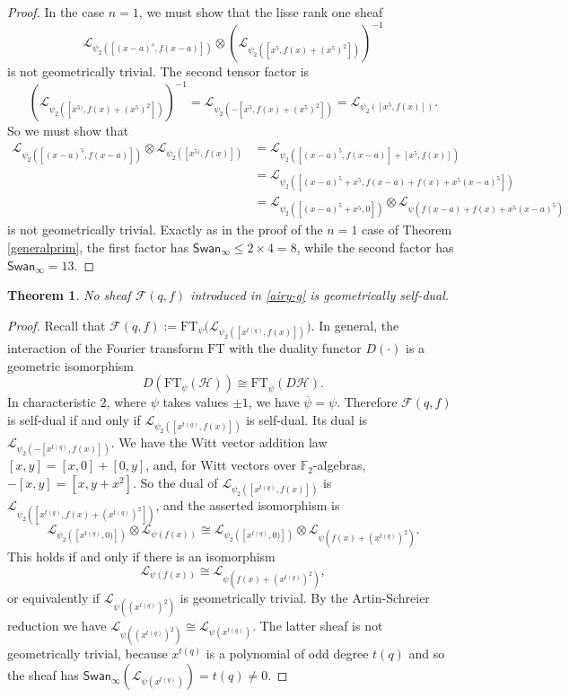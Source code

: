 \documentclass[11pt]{amsart}
\theoremstyle{plain}
\newtheorem{thm}{Theorem}
\theoremstyle{definition}
\numberwithin{thm}{section}
\numberwithin{equation}{thm}
\newcommand{\Swan}{\mathsf {Swan}}
\newcommand{\sF}{{\mathcal F}}
\newcommand{\sH}{{\mathcal H}}
\newcommand{\sL}{{\mathcal L}}
\newcommand{\F}{{\mathbb F}}
\newcommand{\0}{\emptyset}
\newcommand{\FT}{\mathrm{FT}}
\begin{document}
\begin{proof}
In the case $n=1$, we must show that the lisse rank one sheaf
$$\sL_{\psi_2([(x-a)^{s},f(x-a)])} \otimes (\sL_{\psi_2([x^{5},f(x)+(x^{5})^2])} )^{-1}$$
is not geometrically trivial. The second tensor factor is
$$(\sL_{\psi_2([x^{5)},f(x)+(x^{5})^2])} )^{-1}=\sL_{\psi_2(-[x^{5},f(x)+(x^{5})^2])} =\sL_{\psi_2([x^{5},f(x)])}.$$
So we must show that 
$$\begin{aligned}\sL_{\psi_2([(x-a)^{5},f(x-a)])} \otimes \sL_{\psi_2([x^{5)},f(x)])}
   &  = \sL_{\psi_2([(x-a)^{5},f(x-a)] +[x^{5},f(x)])}\\
   & =\sL_{\psi_2([(x-a)^{5} +x^{5}, f(x-a)+f(x) +x^{5}(x-a)^5])}\\
   & =\sL_{\psi_2([(x-a)^{5} +x^{5},0])}\otimes \sL_{\psi(f(x-a)+f(x) +x^{5}(x-a)^{5})}\end{aligned}$$
is not geometrically trivial. Exactly as in the proof of the $n=1$ case of Theorem \ref{generalprim}, the first factor has $\Swan_\infty \le 2\times 4=8$,
while the second factor has $\Swan_\infty=13$.
    \end{proof}

\begin{thm}\label{notselfdual}No sheaf $\sF(q,f)$ introduced in \eqref{airy-g} is geometrically self-dual. 
\end{thm}
\begin{proof}Recall that $\sF(q,f) :=\FT_{\psi}\bigl(\sL_{\psi_2([x^{t(q)},f(x)])}\bigr)$. In general, the interaction of the Fourier transform $\FT$ with the duality functor $D(\cdot)$ is a geometric isomorphism
$$D(\FT_\psi(\sH)) \cong \FT_{\overline{\psi}}(D\sH).$$
In characteristic $2$, where $\psi$ takes values $\pm 1$, we have $\overline{\psi}=\psi$. Therefore $\sF(q,f) $ is self-dual if and only if 
$\sL_{\psi_2([x^{t(q)},f(x)])}$ is self-dual. Its dual is $\sL_{\psi_2(-[x^{t(q)},f(x)])}$.
We have the Witt vector addition law $[x,y]=[x,0]+[0,y]$, and, for Witt vectors over $\F_2$-algebras, $-[x,y]=[x,y+x^2]$. 
So the dual of $\sL_{\psi_2([x^{t(q)},f(x)])}$ is $\sL_{\psi_2([x^{t(q)},f(x)+(x^{t(q)})^2])}$, and 
the asserted isomorphism is
$$\sL_{\psi_2([x^{t(q)},0)])}\otimes \sL_{\psi(f(x))} \cong \sL_{\psi_2([x^{t(q)},0)])}\otimes \sL_{\psi(f(x)+(x^{t(q)})^2)}.$$
This holds if and only if  there is an isomorphism
$$\sL_{\psi(f(x))} \cong  \sL_{\psi(f(x)+(x^{t(q)})^2)},$$
or equivalently if $\sL_{\psi((x^{t(q)})^2)}$ is geometrically trivial. By the Artin-Schreier reduction we have 
$\sL_{\psi((x^{t(q)})^2)} \cong  \sL_{\psi(x^{t(q)})}$. The latter sheaf
is not geometrically trivial, because $x^{t(q)}$ is a polynomial of odd degree $t(q)$ and so the sheaf has $\Swan_\infty(\sL_{\psi(x^{t(q)})})=t(q) \neq 0$.
\end{proof}
\end{document}
